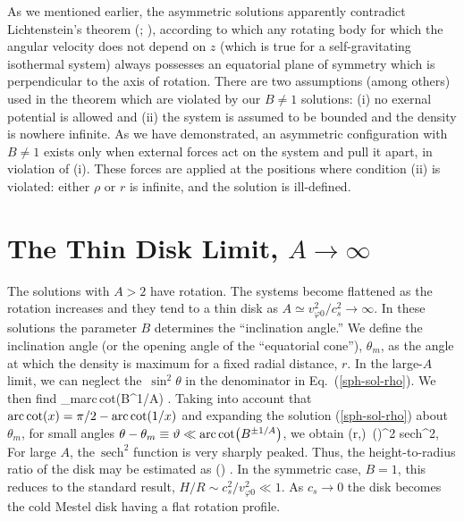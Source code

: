 As we mentioned earlier, the asymmetric solutions apparently contradict 
Lichtenstein's theorem (\cite{Lich}; \cite{Wavre}), according to which
any rotating body for which the angular velocity does not depend on $z$ 
(which is true for a self-gravitating isothermal system) always possesses
an equatorial plane of symmetry which is perpendicular to the axis of rotation.
There are two assumptions (among others) used in the theorem which are violated 
by our $B\not=1$ solutions: (i) no exernal potential is allowed and 
(ii) the system is assumed
to be bounded and the density is nowhere infinite. As we have demonstrated, 
an asymmetric configuration with $B\not=1$ exists only when 
external forces act on the system and pull it apart, in violation of (i). 
These forces are applied at the positions where condition (ii) is violated:
either $\rho$ or $r$ is infinite, and the solution is ill-defined. 


\section{The Thin Disk Limit, $A\to\infty$ \label{S:A=INFINITY} }

The solutions with $A>2$ have rotation. The 
systems become flattened as the rotation increases and they tend to a thin disk
as $A\simeq v_{\varphi0}^2/c_s^2\to\infty$. In these solutions
the parameter $B$ determines the 
``inclination angle.'' We define the inclination angle (or the opening
angle of the ``equatorial cone''), $\theta_m$, as the angle at which the
density is maximum for a fixed radial distance, $r$. In the large-$A$ limit, we 
can neglect the\ $\sin^2\theta$ in the denominator in Eq.\ (\ref{sph-sol-rho}).
We then find
\beq
\theta_m\;\textrm{arc\,cot}\left(B^{1/A}\right) .
\eeq
Taking into account that $\textrm{arc\,cot}(x)=\pi/2-\textrm{arc\,cot}(1/x)$ 
and expanding the solution
(\ref{sph-sol-rho}) about $\theta_m$, for small angles 
$\theta-\theta_m\equiv\vartheta\ll\textrm{arc\,cot}\!\left(B^{\pm1/A}\right)$, 
we obtain
\beq
\rho(r,\vartheta)\simeq 
{}\,\left(\right)^2
\textrm{sech}^2\! ,
\eeq
For large $A$, the\ $\textrm{sech}^2$ function is very sharply peaked. 
Thus, the height-to-radius ratio of the disk may be estimated as 
\beq
{}\simeq\Delta\vartheta\simeq{}
\left(\right) .
\eeq
In the symmetric case, $B=1$, this reduces to the standard result, 
$H/R\sim c_s^2/v_{\varphi0}^2\ll1$. As $c_s\to 0$ the disk becomes the
cold Mestel disk having a flat rotation profile.

